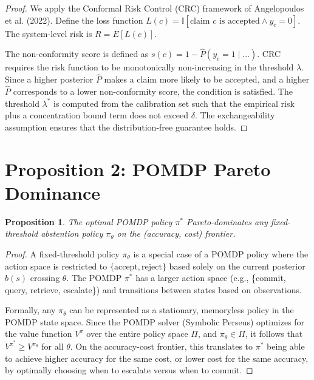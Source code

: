 \documentclass[11pt,a4paper]{article}
\newtheorem{proposition}{Proposition}
\begin{document}
\begin{proof}
We apply the Conformal Risk Control (CRC) framework of Angelopoulos et al. (2022). Define the loss function $L(c) = \mathbb{I}[\text{claim } c \text{ is accepted} \land y_c = 0]$. The system-level risk is $R = E[L(c)]$. 

The non-conformity score is defined as $s(c) = 1 - \hat{P}(y_c=1 \mid \dots)$. CRC requires the risk function to be monotonically non-increasing in the threshold $\lambda$. Since a higher posterior $\hat{P}$ makes a claim more likely to be accepted, and a higher $\hat{P}$ corresponds to a lower non-conformity score, the condition is satisfied. The threshold $\lambda^*$ is computed from the calibration set such that the empirical risk plus a concentration bound term does not exceed $\delta$. The exchangeability assumption ensures that the distribution-free guarantee holds.
\end{proof}

\section{Proposition 2: POMDP Pareto Dominance}

\begin{proposition}
The optimal POMDP policy $\pi^*$ Pareto-dominates any fixed-threshold abstention policy $\pi_\theta$ on the (accuracy, cost) frontier.
\end{proposition}

\begin{proof}
A fixed-threshold policy $\pi_\theta$ is a special case of a POMDP policy where the action space is restricted to $\{\text{accept}, \text{reject}\}$ based solely on the current posterior $b(s)$ crossing $\theta$. The POMDP $\pi^*$ has a larger action space (e.g., \{commit, query, retrieve, escalate\}) and transitions between states based on observations. 

Formally, any $\pi_\theta$ can be represented as a stationary, memoryless policy in the POMDP state space. Since the POMDP solver (Symbolic Perseus) optimizes for the value function $V^\pi$ over the entire policy space $\Pi$, and $\pi_\theta \in \Pi$, it follows that $V^{\pi^*} \geq V^{\pi_\theta}$ for all $\theta$. On the accuracy-cost frontier, this translates to $\pi^*$ being able to achieve higher accuracy for the same cost, or lower cost for the same accuracy, by optimally choosing when to escalate versus when to commit.
\end{proof}
\end{document}
